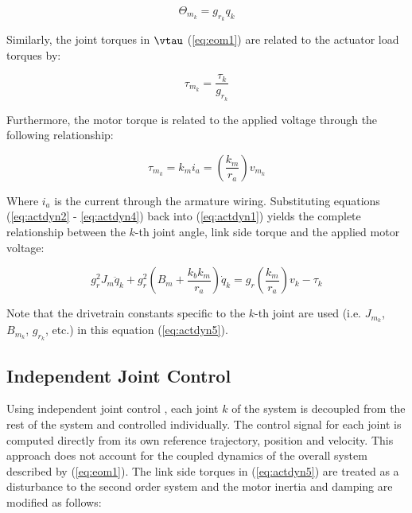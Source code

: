\begin{equation}
	{\Theta _{m_k}} = {g _{r_k}} {q _k}
	\label{eq:actdyn2} 
\end{equation}

Similarly, the joint torques in $\vtau$ (\ref{eq:eom1}) are related to the actuator load torques by: 

\begin{equation}
	{\tau _{m_k}} = {\frac{\tau _{k}}{g _{r_k}}} 
	\label{eq:actdyn3}
\end{equation}

Furthermore, the motor torque is related to the applied voltage through the following relationship: 

\begin{equation}
	{\tau _{m_k}} = {k_m} {i_a} = \left( {\frac{{{k_m}}}{{{r_a}}}} \right){v _{m_k}}
	\label{eq:actdyn4}
\end{equation}


Where $i_a$ is the current through the armature wiring. Substituting equations (\ref{eq:actdyn2} - \ref{eq:actdyn4}) back into (\ref{eq:actdyn1}) yields the complete relationship between the $k$-th joint angle, link side torque and the applied motor voltage:

\begin{equation}
	g_r^2{J_m}{\ddot q_k} + g_r^2\left( {{B_m} + \frac{{{k_b}{k_m}}}{{{r_a}}}} \right){\dot q_k} = g_r^{}\left( {\frac{{{k_m}}}{{{r_a}}}} \right){v_k} - {\tau _k}
	\label{eq:actdyn5}
\end{equation}

Note that the drivetrain constants specific to the $k$-th joint are used (i.e. ${J _{m_k}}$, ${B _{m_k}}$, $g _{r_k}$, etc.) in this equation (\ref{eq:actdyn5}). 

\subsection{Independent Joint Control} %
\label{sub:independent_joint_control}


Using independent joint control \cite{Sciavicco2001}, each joint $k$ of the system is decoupled from the rest of the system and controlled individually. The control signal for each joint is computed directly from its own reference trajectory, position and velocity. This approach does not account for the coupled dynamics of the overall system described by (\ref{eq:eom1}). The link side torques in (\ref{eq:actdyn5}) are treated as a disturbance to the second order system and the motor inertia and damping are modified as follows: 

